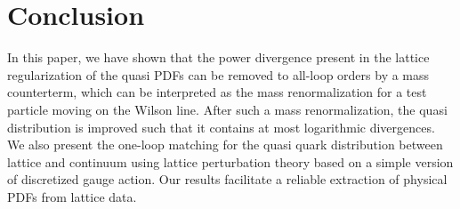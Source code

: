 \section{Conclusion}
In this paper, we have shown that the power divergence present in the lattice regularization of the quasi PDFs can be removed to all-loop orders by a mass counterterm, which can be interpreted as the mass renormalization for a test particle moving on the Wilson line. After such a mass renormalization, the quasi distribution is improved such that it contains at most logarithmic divergences. We also present the one-loop matching for the quasi quark distribution between lattice and continuum using lattice perturbation theory based on a simple version of discretized gauge action. Our results facilitate a reliable extraction of physical PDFs from lattice data. 

